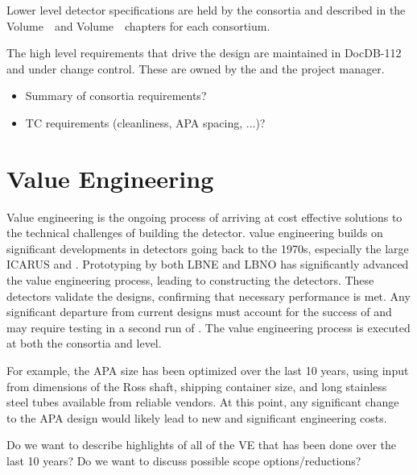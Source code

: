 Lower level detector specifications are held by the consortia and described in the   
Volume~\volnumbersp\ and  Volume~\volnumberdp\ chapters for
each consortium.

The high level  requirements that drive the  design are
maintained in DocDB-112 and under change control. These are owned by
the   and the  project manager.

\begin{itemize}
 \item Summary of consortia requirements?
 \item TC requirements (cleanliness, APA spacing, ...)?
\end{itemize}


\section{Value Engineering}
\label{sec:fdsp-coord-ve}

Value engineering is the ongoing process of arriving at cost effective
solutions to the technical challenges of building the 
detector.  value engineering builds on significant
developments in  detectors going back to the 1970s, especially the large  ICARUS and
. Prototyping by both LBNE and LBNO has significantly
advanced the value engineering process, leading to constructing
the  detectors. These detectors validate the
 designs, confirming that necessary performance is
met. Any significant departure from current designs must account for
the success of  and may require testing in a second
run of . The value engineering process is executed
at both the consortia and  level.

For example, the APA  size has been optimized over the last 10 years,
using input from dimensions of the Ross shaft, shipping container size,
and long stainless steel tubes available from reliable vendors.
At this point, any significant change to the APA design would likely
lead to new and significant engineering costs.

Do we want to describe highlights of all of the VE that has been done
over the last 10 years? Do we want to discuss possible scope options/reductions?

